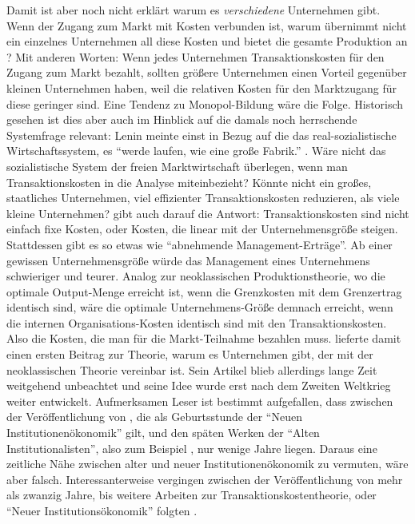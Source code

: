 Damit ist aber noch nicht erklärt warum es \textit{verschiedene} Unternehmen gibt. Wenn der Zugang zum Markt mit Kosten verbunden ist, warum übernimmt nicht ein einzelnes Unternehmen all diese Kosten und bietet die gesamte Produktion an \parencite[S. 394]{Coase1937}? Mit anderen Worten: Wenn jedes Unternehmen Transaktionskosten für den Zugang zum Markt bezahlt, sollten größere Unternehmen einen Vorteil gegenüber kleinen Unternehmen haben, weil die relativen Kosten für den Marktzugang für diese geringer sind. Eine Tendenz zu Monopol-Bildung wäre die Folge. Historisch gesehen ist dies aber auch im Hinblick auf die damals noch herrschende Systemfrage relevant: Lenin meinte einst in Bezug auf die das real-sozialistische Wirtschaftssystem, es "`werde laufen, wie eine große Fabrik."' \parencite[S. 113]{Warsh}. Wäre nicht das sozialistische System der freien Marktwirtschaft überlegen, wenn man Transaktionskosten in die Analyse miteinbezieht? Könnte nicht ein großes, staatliches Unternehmen, viel effizienter Transaktionskosten reduzieren, als viele kleine Unternehmen? \textcite[S. 395]{Coase1937} gibt auch darauf die Antwort: Transaktionskosten sind nicht einfach fixe Kosten, oder Kosten, die linear mit der Unternehmensgröße steigen. Stattdessen gibt es so etwas wie "`abnehmende Management-Erträge"'. Ab einer gewissen Unternehmensgröße würde das Management eines Unternehmens schwieriger und teurer. Analog zur neoklassischen Produktionstheorie, wo die optimale Output-Menge erreicht ist, wenn die Grenzkosten mit dem Grenzertrag identisch sind, wäre die optimale Unternehmens-Größe demnach erreicht, wenn die internen Organisations-Kosten identisch sind mit den Transaktionskosten. Also die Kosten, die man für die Markt-Teilnahme bezahlen muss. \textcite{Coase1937} lieferte damit einen ersten Beitrag zur Theorie, warum es Unternehmen gibt, der mit der neoklassischen Theorie vereinbar ist. Sein Artikel blieb allerdings lange Zeit weitgehend unbeachtet \parencite{Coase1991a} und seine Idee wurde erst nach dem Zweiten Weltkrieg weiter entwickelt. Aufmerksamen Leser ist bestimmt aufgefallen, dass zwischen der Veröffentlichung von \textcite{Coase1937}, die als Geburtsstunde der "`Neuen Institutionenökonomik"' gilt, und den späten Werken der "`Alten Institutionalisten"', also zum Beispiel \textcite{Commons1934}, nur wenige Jahre liegen. Daraus eine zeitliche Nähe zwischen alter und neuer Institutionenökonomik zu vermuten, wäre aber falsch. Interessanterweise vergingen zwischen der Veröffentlichung von \textcite{Coase1937} mehr als zwanzig Jahre, bis weitere Arbeiten zur Transaktionskostentheorie, oder "`Neuer Institutionsökonomik"' folgten \parencite[S. 148]{Blaug2001}.

